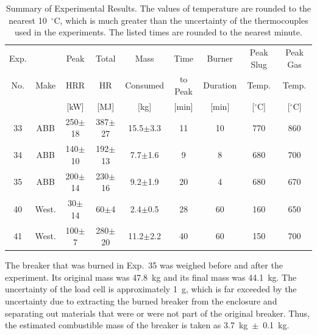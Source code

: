 \documentclass[12pt]{article}
\begin{document}
\begin{table}[ht]
\begin{center}
\caption[Summary of Experimental Results]{Summary of Experimental Results. The values of temperature are rounded to the nearest 10~$^\circ$C, which is much greater than the uncertainty of the thermocouples used in the experiments. The listed times are rounded to the nearest minute.}
\label{matrix}
\begin{tabular}{|c|c|c|c|c|c|c|c|c|}
\hline
Exp.   &                & Peak           & Total      & Mass            & Time            & Burner       & Peak Slug    & Peak Gas      \\
No.    & Make           & HRR            & HR         & Consumed        & to Peak         & Duration     & Temp.        & Temp.         \\
       &                & [kW]           & [MJ]       & [kg]            & [min]           & [min]        & [$^\circ$C]  & [$^\circ$C]   \\ \hline
33     & ABB            & 250$\pm$18     & 387$\pm$27 & 15.5$\pm$3.3    & 11              & 10           & 770          & 860           \\ \hline
34     & ABB            & 140$\pm$10     & 192$\pm$13 & 7.7$\pm$1.6     & 9               & 8            & 680          & 700           \\ \hline
35     & ABB            & 200$\pm$14     & 230$\pm$16 & 9.2$\pm$1.9     & 20              & 4            & 680          & 670           \\ \hline
40     & West.          & 30$\pm$14      & 60$\pm$4   & 2.4$\pm$0.5     & 28              & 60           & 160          & 650           \\ \hline
41     & West.          & 100$\pm$7      & 280$\pm$20 & 11.2$\pm$2.2    & 40              & 60           & 150          & 700           \\ \hline
\end{tabular}
\end{center}
\end{table}

The breaker that was burned in Exp.~35 was weighed before and after the experiment. Its original mass was 47.8~kg and its final mass was 44.1~kg. The uncertainty of the load cell is approximately 1~g, which is far exceeded by the uncertainty due to extracting the burned breaker from the enclosure and separating out materials that were or were not part of the original breaker. Thus, the estimated combustible mass of the breaker is taken as 3.7~kg~$\pm$~0.1~kg.
\end{document}
